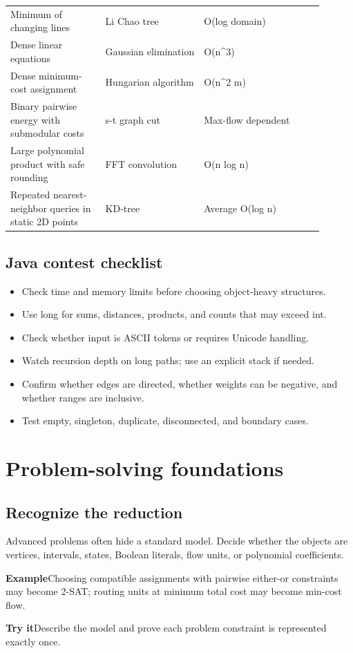 \documentclass[10pt,letterpaper]{article}
\newcommand{\entrylabel}[1]{\textcolor{accent}{\bfseries #1}}
\begin{document}
\begin{longtable}{>{\raggedright\arraybackslash}p{0.27\linewidth}>{\raggedright\arraybackslash}p{0.29\linewidth}>{\raggedright\arraybackslash}p{0.34\linewidth}}
Minimum of changing lines & Li Chao tree & O(log domain)\\
Dense linear equations & Gaussian elimination & O(n\textasciicircum{}3)\\
Dense minimum-cost assignment & Hungarian algorithm & O(n\textasciicircum{}2 m)\\
Binary pairwise energy with submodular costs & s-t graph cut & Max-flow dependent\\
Large polynomial product with safe rounding & FFT convolution & O(n log n)\\
Repeated nearest-neighbor queries in static 2D points & KD-tree & Average O(log n)\\
\bottomrule\end{longtable}\normalsize
\subsection*{Java contest checklist}
\begin{guidebox}\begin{itemize}
\item Check time and memory limits before choosing object-heavy structures.
\item Use long for sums, distances, products, and counts that may exceed int.
\item Check whether input is ASCII tokens or requires Unicode handling.
\item Watch recursion depth on long paths; use an explicit stack if needed.
\item Confirm whether edges are directed, whether weights can be negative, and whether ranges are inclusive.
\item Test empty, singleton, duplicate, disconnected, and boundary cases.
\end{itemize}\end{guidebox}
\section*{Problem-solving foundations}
\subsection*{Recognize the reduction}
Advanced problems often hide a standard model. Decide whether the objects are vertices, intervals, states, Boolean literals, flow units, or polynomial coefficients.\par
\begin{guidebox}\entrylabel{Example}\quad Choosing compatible assignments with pairwise either-or constraints may become 2-SAT; routing units at minimum total cost may become min-cost flow.\par
\entrylabel{Try it}\quad Describe the model and prove each problem constraint is represented exactly once.\end{guidebox}
\end{document}
